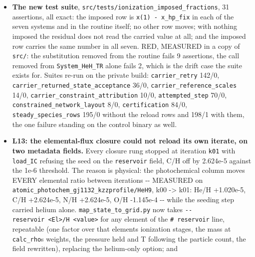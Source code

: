 \documentclass[english,a4paper]{my_memo}
\begin{document}
\begin{itemize}
  files agree byte for byte. Against \texttt{backup/regression/golden/} the four
  molecular cases are WITHIN 1e-3 and not bitwise, by 1e-7 to 5e-5 relative,
  and \texttt{wasp\_full} EXCEEDS it at a velocity that changes sign at row 209 -\/-
  on the control binary exactly as on the measured one, to the last digit of
  every quoted value. Those goldens stand behind other changes in this
  working tree, not behind this one.
\item
  \textbf{The new test suite}, \texttt{src/tests/ionization\_imposed\_fractions}, 31
  assertions, all exact: the imposed row is \texttt{x(1)\ -\ x\_hp\_fix} in each of the
  seven systems and in the routine itself; no other row moves; with nothing
  imposed the residual does not read the carried value at all; and the
  imposed row carries the same number in all seven. RED, MEASURED in a copy
  of \texttt{src/}: the substitution removed from the routine fails 9 assertions,
  the call removed from \texttt{System\_HeH\_TR} alone fails 2, which is the drift
  case the suite exists for. Suites re-run on the private build:
  \texttt{carrier\_retry} 142/0, \texttt{carrier\_returned\_state\_acceptance} 36/0,
  \texttt{carrier\_reference\_scales} 14/0, \texttt{carrier\_constraint\_attribution} 10/0,
  \texttt{attempted\_step} 70/0, \texttt{constrained\_network\_layout} 8/0, \texttt{certification}
  84/0, \texttt{steady\_species\_rows} 195/0 without the reload rows and 198/1 with
  them, the one failure standing on the control binary as well.
\item
  \textbf{L13: the elemental-flux closure could not reload its own iterate, on two
  metadata fields.} Every closure rung stopped at iteration \texttt{k01} with
  \texttt{load\_IC} refusing the seed on the \texttt{reservoir} field, C/H off by 2.624e-5
  against the 1e-6 threshold. The reason is physical: the photochemical
  column moves EVERY elemental ratio between iterations -\/- MEASURED on
  \texttt{atomic\_photochem\_gj1132\_kzzprofile/HeH9}, k00 -\textgreater{} k01: He/H +1.020e-5,
  C/H +2.624e-5, N/H +2.624e-5, O/H -1.145e-4 -\/- while the seeding step
  carried helium alone. \texttt{map\_state\_to\_grid.py} now takes
  \texttt{-\/-reservoir\ \textless{}El\textgreater{}/H\ \textless{}value\textgreater{}} for any element of the \texttt{\#\ reservoir} line,
  repeatable (one factor over that element\textquotesingle s ionization stages, the mass at
  \texttt{calc\_rho}\textquotesingle s weights, the pressure held and T following the particle count,
  the field rewritten), replacing the helium-only option; and

\end{itemize}
\end{document}
